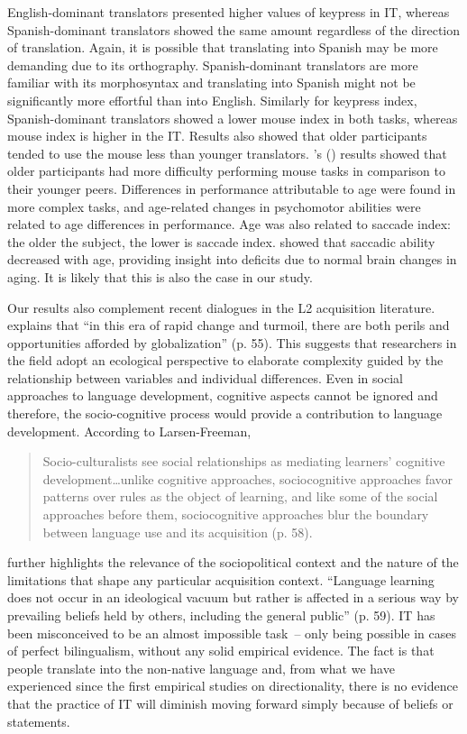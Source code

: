\documentclass[output=paper]{langscibook}
\begin{document}
English-dominant translators presented higher values of keypress in IT, where\-as Spanish-dominant translators showed the same amount regardless of the direction of translation. Again, it is possible that translating into Spanish may be more demanding due to its orthography. Spanish-dominant translators are more familiar with its morphosyntax and translating into Spanish might not be significantly more effortful than into English. Similarly for keypress index, Spanish-dominant translators showed a lower mouse index in both tasks, whereas mouse index is higher in the IT. Results also showed that older participants tended to use the mouse less than younger translators. \citeauthor{smith1999aging}'s (\citeyear{smith1999aging}) results showed that older participants had more difficulty performing mouse tasks in comparison to their younger peers. Differences in performance attributable to age were found in more complex tasks, and age-related changes in psychomotor abilities were related to age differences in performance. Age was also related to saccade index: the older the subject, the lower is saccade index. \citet{peltsch2011age} showed that saccadic ability decreased with age, providing insight into deficits due to normal brain changes in aging. It is likely that this is also the case in our study.

Our results also complement recent dialogues in the L2 acquisition literature. \citet{larsen2018looking} explains that “in this era of rapid change and turmoil, there are both perils and opportunities afforded by globalization” (p. 55). This suggests that researchers in the field adopt an ecological perspective to elaborate complexity guided by the relationship between variables and individual differences. Even in social approaches to language development, cognitive aspects cannot be ignored and therefore, the socio-cognitive process would provide a contribution to language development. According to Larsen-Freeman,

\begin{quote}
Socio-culturalists see social relationships as mediating learners’ cognitive development…unlike cognitive approaches, sociocognitive approaches favor patterns over rules as the object of learning, and like some of the social approaches before them, sociocognitive approaches blur the boundary between language use and its acquisition (p. 58). 
\end{quote}

\citet{larsen2018looking} further highlights the relevance of the sociopolitical context and the nature of the limitations that shape any particular acquisition context. “Language learning does not occur in an ideological vacuum but rather is affected in a serious way by prevailing beliefs held by others, including the general public” (p. 59). IT has been misconceived to be an almost impossible task~-- only being possible in cases of perfect bilingualism, without any solid empirical evidence. The fact is that people translate into the non-native language and, from what we have experienced since the first empirical studies on directionality, there is no evidence that the practice of IT will diminish moving forward simply because of beliefs or statements. 
\end{document}
